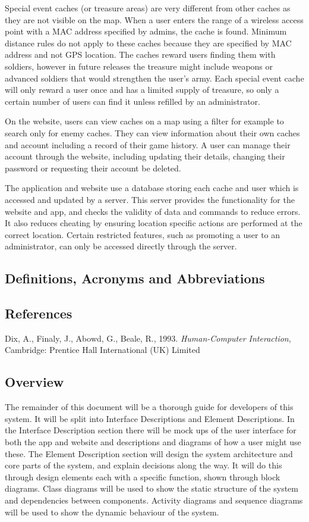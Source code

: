 Special event caches (or treasure areas) are very different from other caches as they are not visible on the map. When a user enters the range of a wireless access point with a MAC address specified by admins, the cache is found. Minimum distance rules do not apply to these caches because they are specified by MAC address and not GPS location. The caches reward users finding them with soldiers, however in future releases the treasure might include weapons or advanced soldiers that would strengthen the user’s army. Each special event cache will only reward a user once and has a limited supply of treasure, so only a certain number of users can find it unless refilled by an administrator.

On the website, users can view caches on a map using a filter for example to search only for enemy caches. They can view information about their own caches and account including a record of their game history. A user can manage their account through the website, including updating their details, changing their password or requesting their account be deleted.

The application and website use a database storing each cache and user which is accessed and updated by a server. This server provides the functionality for the website and app, and checks the validity of data and commands to reduce errors. It also reduces cheating by ensuring location specific actions are performed at the correct location. Certain restricted features, such as promoting a user to an administrator, can only be accessed directly through the server.

\subsection{Definitions, Acronyms and Abbreviations}

\subsection{References}

Dix, A., Finaly, J., Abowd, G., Beale, R., 1993. \emph{Human-Computer Interaction}, Cambridge: Prentice Hall International (UK) Limited

\subsection{Overview}

The remainder of this document will be a thorough guide for developers of this system. It will be split into Interface Descriptions and Element Descriptions. In the Interface Description section there will be mock ups of the user interface for both the app and website and descriptions and diagrams of how a user might use these. The Element Description section will design the system architecture and core parts of the system, and explain decisions along the way. It will do this through design elements each with a specific function, shown through block diagrams. Class diagrams will be used to show the static structure of the system and dependencies between components. Activity diagrams and sequence diagrams will be used to show the dynamic behaviour of the system.



